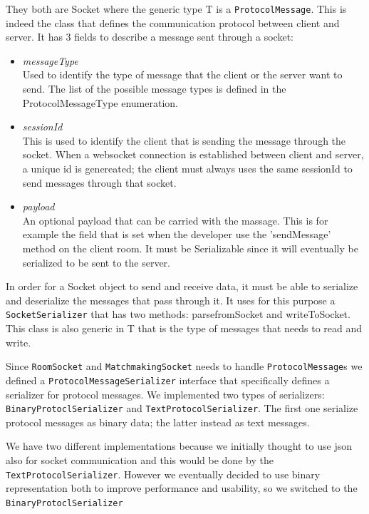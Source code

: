 They both are Socket where the generic type T is a \texttt{ProtocolMessage}. This is indeed the class that defines the communication protocol between client and server. It has 3 fields to describe a message sent through a socket:
\begin{itemize}
	\item \textit{messageType} \\
	Used to identify the type of message that the client or the server want to send. The list of the possible message types is defined in the ProtocolMessageType enumeration.
	\item \textit{sessionId} \\
	This is used to identify the client that is sending the message through the socket. When a websocket connection is established between client and server, a unique id is genereated; the client must always uses the same sessionId to send messages through that socket.
	\item \textit{payload} \\ 
	An optional payload that can be carried with the massage. This is for example the field that is set when the developer use the 'sendMessage' method on the client room. It must be Serializable since it will eventually be serialized to be sent to the server.
\end{itemize}

In order for a Socket object to send and receive data, it must be able to serialize and deserialize the messages that pass through it. It uses for this purpose a \texttt{SocketSerializer} that has two methods: parsefromSocket and writeToSocket. This class is also generic in T that is the type of messages that needs to read and write.

Since \texttt{RoomSocket} and \texttt{MatchmakingSocket} needs to handle \texttt{ProtocolMessage}s we defined a \texttt{ProtocolMessageSerializer} interface that specifically defines a serializer for protocol messages. We implemented two types of serializers: \texttt{BinaryProtoclSerializer} and \texttt{TextProtocolSerializer}. The first one serialize protocol messages as binary data; the latter instead as text messages.
 
We have two different implementations because we initially thought to use json also for socket communication and this would be done by the \texttt{TextProtocolSerializer}. However we eventually decided to use binary representation both to improve performance and usability, so we switched to the \texttt{BinaryProtoclSerializer}


